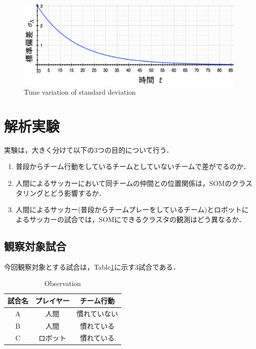 \clearpage %

\begin{figure}[ht]
  \begin{center}
  
    \includegraphics[clip,width=15.0cm]{figure/Time_variation_of_standard_deviation.eps}
    \caption{Time variation of standard deviation}
    \label{fig:Time variation of standard deviation}
    
  \end{center}
\end{figure}

\clearpage%

%
\section{解析実験}
実験は，大きく分けて以下の3つの目的について行う．

\begin{enumerate}
  \item 普段からチーム行動をしているチームとしていないチームで差がでるのか．
  \item 人間によるサッカーにおいて同チームの仲間との位置関係は，SOMのクラスタリングとどう影響するか．
  \item 人間によるサッカー(普段からチームプレーをしているチーム)とロボットによるサッカーの試合では，SOMにできるクラスタの観測はどう異なるか． 
\end{enumerate}

\subsection{観察対象試合}
今回観察対象とする試合は，Table\ref{table1}に示す3試合である．

\begin{table}[htb]
	\begin{center}
	\caption{Observation}
	\begin{tabular}{|c|c|c|}\hline
		\label{table1}
	 	試合名 & プレイヤー & チーム行動  \\ \hline \hline
	 	A & 人間 & 慣れていない  \\
   	 	B & 人間 & 慣れている \\
   		C & ロボット & 慣れている \\ \hline
	\end{tabular}
	\end{center}
\end{table}

